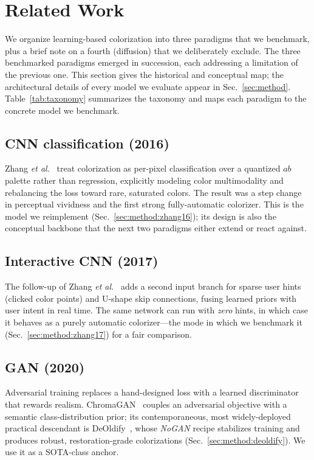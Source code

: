 \section{Related Work}
\label{sec:related_work}

We organize learning-based colorization into three paradigms that we benchmark,
plus a brief note on a fourth (diffusion) that we deliberately exclude. The
three benchmarked paradigms emerged in succession, each addressing a limitation
of the previous one. This section gives the historical and conceptual map; the
architectural details of every model we evaluate appear in
Sec.~\ref{sec:method}. Table~\ref{tab:taxonomy} summarizes the taxonomy and
maps each paradigm to the concrete model we benchmark.

\subsection{CNN classification (2016)}
Zhang \emph{et al.}~\cite{zhang2016colorful} treat colorization as per-pixel
classification over a quantized $ab$ palette rather than regression, explicitly
modeling color multimodality and rebalancing the loss toward rare, saturated
colors. The result was a step change in perceptual vividness and the first
strong fully-automatic colorizer. This is the model we reimplement
(Sec.~\ref{sec:method:zhang16}); its design is also the conceptual backbone
that the next two paradigms either extend or react against.

\subsection{Interactive CNN (2017)}
The follow-up of Zhang \emph{et al.}~\cite{zhang2017realtime} adds a second
input branch for sparse user hints (clicked color points) and U-shape skip
connections, fusing learned priors with user intent in real time. The same
network can run with \emph{zero} hints, in which case it behaves as a purely
automatic colorizer---the mode in which we benchmark it
(Sec.~\ref{sec:method:zhang17}) for a fair comparison.

\subsection{GAN (2020)}
Adversarial training replaces a hand-designed loss with a learned
discriminator that rewards realism. ChromaGAN~\cite{vitoria2020chromagan}
couples an adversarial objective with a semantic class-distribution prior; its
contemporaneous, most widely-deployed practical descendant is
DeOldify~\cite{antic2019deoldify}, whose \emph{NoGAN} recipe stabilizes
training and produces robust, restoration-grade colorizations
(Sec.~\ref{sec:method:deoldify}). We use it as a SOTA-class anchor.


